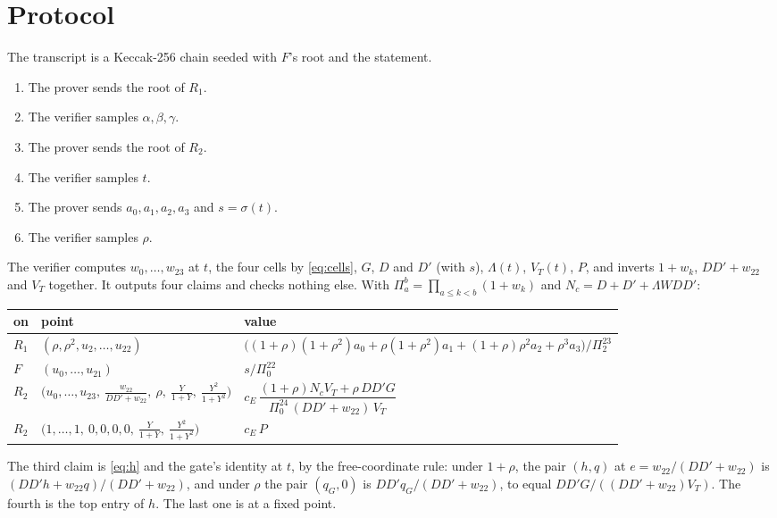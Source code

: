\documentclass[11pt]{article}
\newcommand{\E}{E}
\newcommand{\reps}{T}
\newcommand{\vT}{V_{\reps}}
\newcommand{\wit}{W}
\newcommand{\perm}{\sigma}
\newcommand{\pub}{\Lambda}
\newcommand{\gate}{G}
\newcommand{\target}{P}
\begin{document}
\section{Protocol}

The transcript is a Keccak-256 chain seeded with $F$'s root and the statement.
\begin{enumerate}
  \item The prover sends the root of $R_1$.
  \item The verifier samples $\alpha, \beta, \gamma$.
  \item The prover sends the root of $R_2$.
  \item The verifier samples $t$.
  \item The prover sends $a_0, a_1, a_2, a_3$ and $s = \perm(t)$.
  \item The verifier samples $\rho$.
\end{enumerate}
The verifier computes $w_0, \dots, w_{23}$ at $t$, the four cells by \eqref{eq:cells}, $\gate$, $D$ and $D'$ (with $s$), $\pub(t)$, $\vT(t)$, $\target$, and inverts $1 + w_k$, $D D' + w_{22}$ and $\vT$ together. It outputs four claims and checks nothing else. With $\Pi_a^b = \prod_{a \le k < b} (1 + w_k)$ and $N_c = D + D' + \pub \wit D D'$:
\begin{center}\small
\begin{tabular}{@{}lll@{}}
\toprule
on & point & value \\
\midrule
$R_1$ & $(\rho, \rho^2, u_2, \dots, u_{22})$ & $\bigl((1 + \rho)(1 + \rho^2) a_0 + \rho (1 + \rho^2) a_1 + (1 + \rho) \rho^2 a_2 + \rho^3 a_3\bigr) / \Pi_2^{23}$ \\[2pt]
$F$ & $(u_0, \dots, u_{21})$ & $s / \Pi_0^{22}$ \\[2pt]
$R_2$ & $\bigl(u_0, \dots, u_{23},\ \frac{w_{22}}{D D' + w_{22}},\ \rho,\ \frac{Y}{1 + Y},\ \frac{Y^2}{1 + Y^2}\bigr)$ & $c_\E \, \dfrac{(1 + \rho) N_c \vT + \rho\, D D' \gate}{\Pi_0^{24} \, (D D' + w_{22}) \, \vT}$ \\[8pt]
$R_2$ & $\bigl(1, \dots, 1,\ 0, 0, 0, 0,\ \frac{Y}{1 + Y},\ \frac{Y^2}{1 + Y^2}\bigr)$ & $c_\E \, \target$ \\
\bottomrule
\end{tabular}
\end{center}
The third claim is \eqref{eq:h} and the gate's identity at $t$, by the free-coordinate rule: under $1 + \rho$, the pair $(h, q)$ at $e = w_{22} / (D D' + w_{22})$ is $(D D' h + w_{22} q) / (D D' + w_{22})$, and under $\rho$ the pair $(q_\gate, 0)$ is $D D' q_\gate / (D D' + w_{22})$, to equal $D D' \gate / ((D D' + w_{22}) \vT)$. The fourth is the top entry of $h$. The last one is at a fixed point.
\end{document}

